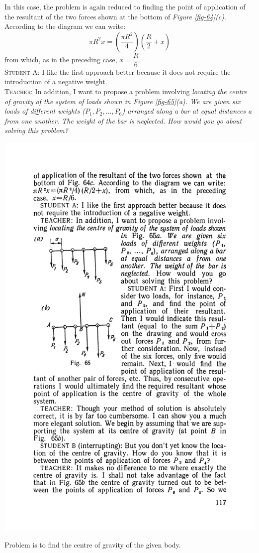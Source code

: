 \documentclass[a4paper,sfsidenotes]{tufte-book}
\begin{document}
In this case, the problem is again reduced to finding the point of application of the resultant of the two forces shown at the bottom of \emph{Figure \ref{fig-64}(c)}. According to the diagram we can write:
\begin{equation*}%
\pi R^{2} x = \left( \frac{\pi R^{2}}{4} \right) \left( \frac{R}{2}+x \right)
\end{equation*}
from which, as in the preceding case, $x=\dfrac{R}{6}$.
\\
\textsc{Student A:} I like the first approach better because it does not require the introduction of a negative weight.
\\
\textsc{Teacher:} In addition, I want to propose a problem involving \emph{locating the centre of gravity of the system of loads shown in  \emph{Figure \ref{fig-65}(a)}. We are given six loads of different weights ($P_{1},P_{2}, \ldots, P_{6}$) arranged along a bar at equal distances a from one another. The weight of the bar is neglected. How would you go about solving this problem?}
\begin{marginfigure}[-6cm]%
\centering
\includegraphics[width=\linewidth,angle=-2.5]{fig-065a.pdf}
\caption{Problem is to find the centre of gravity of the given body.}
\label{fig-65}
\end{marginfigure}
\end{document}
